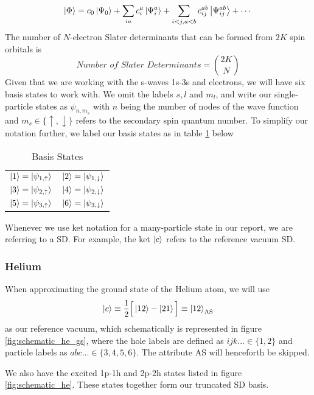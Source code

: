 \documentclass[a4paper,12pt]{article}
\begin{document}
\begin{equation}
\label{eq:SlaterLinearComb}
	\ket{\Phi} = c_0 \ket{\Psi_0} + \sum_{ia} c_i^a \ket{\Psi_i^a} + 					\sum_{i<j,a<b} c_{ij}^{ab} \ket{\Psi_{ij}^{ab}} + \cdots 
\end{equation}
The number of $N$-electron Slater determinants that can be formed from $2K$ spin orbitals is
\begin{equation}
\label{eq:(2K/N)}
	\textit{Number of Slater Determinants} = \binom{2K}{N}
\end{equation}
Given that we are working with the s-waves 1s-3s and electrons, we will have six basis states to work with. We omit the labels $s, l$ and $m_l$, and write our single-particle states as $\psi_{n,m_s}$ with $n$ being the number of nodes of the wave function and $m_s \in \{\uparrow, \downarrow \}$ refers to the secondary spin quantum number. To simplify our notation further, we label our basis states as in table \ref{tab:basisstates} below
\begin{table}[H]
\caption{Basis States}
\centering
\begin{tabular}{cc}
$\ket{1} = \ket{\psi_{1,\uparrow}}$ & $\ket{2} = \ket{\psi_{1,\downarrow}}$ \\[1cm] 
$\ket{3} = \ket{\psi_{2,\uparrow}}$ & $\ket{4} = \ket{\psi_{2,\downarrow}}$ \\[1cm]
$\ket{5} = \ket{\psi_{3,\uparrow}}$ & $\ket{6} = \ket{\psi_{3,\downarrow}}$ 
\label{tab:basisstates}
\end{tabular}
\end{table}
Whenever we use ket notation for a many-particle state in our report, we are referring to a SD. For example, the ket $ \ket{c} $ refers to the reference vacuum SD.

\subsubsection{Helium}
When approximating the ground state of the Helium atom, we will use 
\begin{equation*}
    \ket{c}\equiv\frac{1}{2}\Big[\ket{12}-\ket{21}\Big]\equiv \ket{12}_{\text{AS}}
\end{equation*}
as our reference vacuum, which schematically is represented in figure \ref{fig:schematic_he_gs}, where the hole labels are defined as $ijk... \in \{1,2\}$ and particle labels as $abc... \in \{3,4,5,6\}$. The attribute AS will henceforth be skipped. 

We also have the excited 1p-1h and 2p-2h states listed in figure \ref{fig:schematic_he}. These states together form our truncated SD basis.

\end{document}
